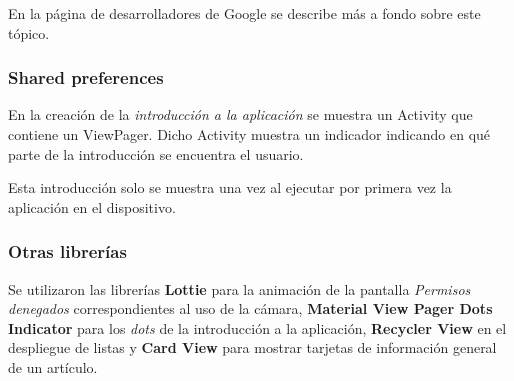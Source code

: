 En la página de desarrolladores de Google se describe más a fondo sobre este tópico. 
\subsubsection{Shared preferences}
En la creación de la \textit{introducción a la aplicación} se muestra un Activity que contiene un ViewPager. Dicho Activity muestra un indicador indicando en qué parte de la introducción se encuentra el usuario.

Esta introducción solo se muestra una vez al ejecutar por primera vez la aplicación en el dispositivo.

\subsubsection{Otras librerías}
Se utilizaron las librerías \textbf{Lottie} para la animación de la pantalla \textit{Permisos denegados} correspondientes al uso de la cámara, \textbf{Material View Pager Dots Indicator} para los \textit{dots} de la introducción a la aplicación, \textbf{Recycler View} en el despliegue de listas y \textbf{Card View} para mostrar tarjetas de información general de un artículo.